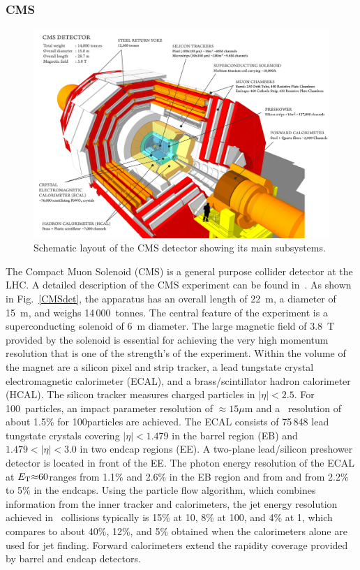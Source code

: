 \subsubsection{CMS}

\begin{figure}
\begin{center}
\includegraphics[height=0.49\textwidth]{introduction_figs/cms_120918_03.png}
\caption{Schematic layout of the CMS detector showing its main subsystems.}
\label{ntroduction_figs:CMSdet}
\end{center}
\end{figure}
The Compact Muon Solenoid (CMS) is a general purpose collider detector at the LHC. A detailed description of the CMS experiment
can be found in~\cite{Chatrchyan:2008zzk}. 
As shown in Fig.~\ref{CMSdet},  the apparatus has an overall length of 22~m, a diameter of 15~m, and weighs 14\,000~tonnes.
The central feature of the experiment is a superconducting solenoid
of 6~m diameter. The large magnetic field of 3.8~T provided by the solenoid is essential for achieving
the very high momentum resolution that is one of the strength's of the experiment.
Within the volume of the magnet are a silicon pixel and strip tracker, a lead tungstate crystal
electromagnetic calorimeter (ECAL), and a brass/scintillator hadron calorimeter (HCAL).
The silicon tracker measures charged particles in $|\eta|< 2.5$.
For 100\GeVc\ particles, an impact parameter resolution of $\approx 15\mu$m and a \pT\
resolution of about 1.5\% for 100\GeV [100\GeVc] particles are achieved.
The ECAL consists of 75\,848 lead tungstate crystals covering $|\eta|< 1.479 $ in the
barrel region (EB) and $1.479 < |\eta| < 3.0$ in two endcap regions (EE).
A two-plane lead/silicon preshower detector is located  in front of the EE.
The photon energy resolution of the ECAL at  $E_{\rm T} {\approx} 60$\GeV ranges from
 1.1\% and 2.6\% in the EB region and from and from 2.2\% to 5\% in the
endcaps. 
Using the particle flow algorithm, which combines information from the inner tracker
and calorimeters, the jet energy resolution achieved in \pp\ collisions typically
is 15\% at 10\GeV, 8\% at 100\GeV, and 4\% at 1\TeV, 
which compares to about 40\%, 12\%, and 5\% obtained when the calorimeters alone 
are used for jet finding.
Forward calorimeters extend the rapidity coverage provided by barrel and endcap detectors.

